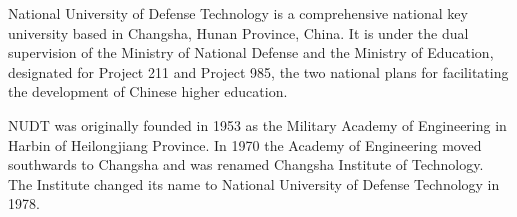 \begin{eabstract}
National University of Defense Technology is a comprehensive national key university based in Changsha, %
Hunan Province, China. It is under the dual supervision of the Ministry of National Defense %
and the Ministry of Education, designated for Project 211 and Project 985, %
the two national plans for facilitating the development of Chinese higher education. %

NUDT was originally founded in 1953 as the Military Academy of Engineering in Harbin of Heilongjiang Province. %
In 1970 the Academy of Engineering moved southwards to Changsha and was renamed Changsha Institute of Technology.%
 The Institute changed its name to National University of Defense Technology in 1978.

\end{eabstract}

